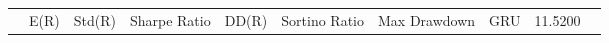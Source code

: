 \begin{tabular}{lrrrrrrrrr}
 & E(R) & Std(R) & Sharpe Ratio & DD(R) & Sortino Ratio & Max Drawdown & %
GRU & 11.5200%
\end{tabular}
